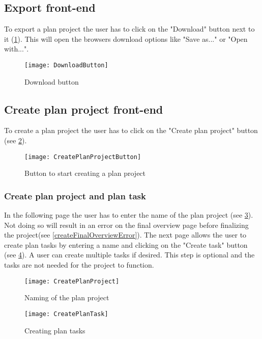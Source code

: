 \subsection{Export front-end}
To export a plan project the user has to click on the "Download" button next to it (\ref{downloadButton}). This will open the browsers download options like "Save as..." or "Open with...".
\begin{figure}[H]
	\centering
	\texttt{[image: DownloadButton]}
	\caption{Download button}
	\label{downloadButton}
\end{figure}

\subsection{Create plan project front-end}
To create a plan project the user has to click on the "Create plan project" button (see \ref{createPlanProjectButton}). 
\begin{figure}[H]
	\centering
	\texttt{[image: CreatePlanProjectButton]}
	\caption{Button to start creating a plan project}
	\label{createPlanProjectButton}
\end{figure}

\subsubsection{Create plan project and plan task}
In the following page the user has to enter the name of the plan project (see \ref{createPlanProject}). Not doing so will result in an error on the final overview page before finalizing the project(see \ref{createFinalOverviewError}). The next page allows the user to create plan tasks by entering a name and clicking on the "Create task" button (see \ref{createPlanTask}). A user can create multiple tasks if desired. This step is optional and the tasks are not needed for the project to function.

\begin{figure}[H]
	\centering
	\texttt{[image: CreatePlanProject]}
	\caption{Naming of the plan project}
	\label{createPlanProject}
\end{figure}
\begin{figure}[H]
	\centering
	\texttt{[image: CreatePlanTask]}
	\caption{Creating plan tasks}
	\label{createPlanTask}
\end{figure}

